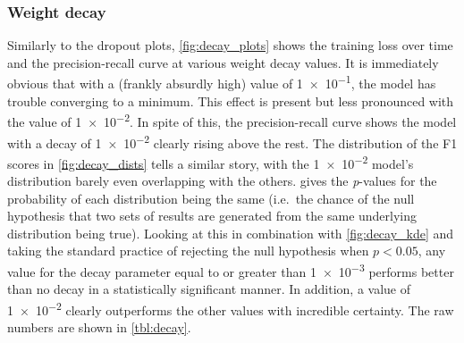 \FloatBarrier%
\subsubsection{Weight decay}
Similarly to the dropout plots, \cref{fig:decay_plots} shows the training loss
over time and the precision-recall curve at various weight decay values. It is
immediately obvious that with a (frankly absurdly high) value of \num{1e-1}, the
model has trouble converging to a minimum. This effect is present but less
pronounced with the value of \num{1e-2}. In spite of this, the precision-recall
curve shows the model with a decay of \num{1e-2} clearly rising above the rest.
The distribution of the F1 scores in \cref{fig:decay_dists} tells a similar
story, with the \num{1e-2} model's distribution barely even overlapping with the
others.  gives the \emph{p}-values for the probability of each
distribution being the same (i.e.\ the chance of the null hypothesis that two
sets of results are generated from the same underlying distribution being true).
Looking at this in combination with \cref{fig:decay_kde} and taking the standard
practice of rejecting the null hypothesis when $p < 0.05$, any value for the
decay parameter equal to or greater than \num{1e-3} performs better than no
decay in a statistically significant manner. In addition, a value of \num{1e-2}
clearly outperforms the other values with incredible certainty. The raw numbers
are shown in \cref{tbl:decay}.

